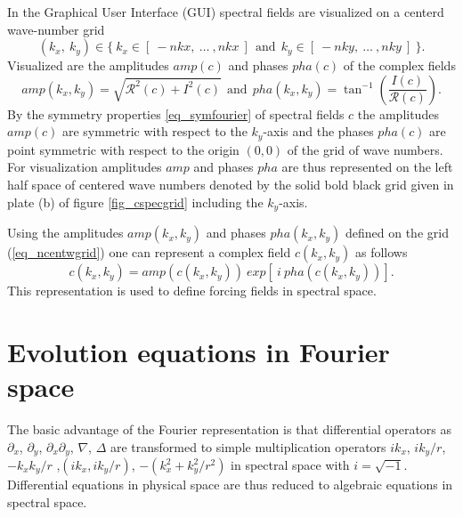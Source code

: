 In the Graphical User Interface (GUI) spectral fields are visualized on
a centerd wave-number grid
\begin{equation} \label{eq_centwgrid}
   (k_{x},\ k_{y}) \in  
   \{\ k_{x} \in [\ -nkx, \ \dots \ ,nkx \ ] 
    \ \ \mbox{and} \ \ 
       k_{y} \in [\ -nky, \ \dots \ ,nky \ ] \ \}.
\end{equation}
Visualized are the amplitudes $amp(c)$ and phases $pha(c)$ of the
complex fields
\begin{equation} \label{eq_c2amppha}
   amp(k_{x},k_{y}) = \sqrt{\mathcal{R}^{2}(c) + I^{2}(c)}
   \ \ \mbox{and} \ \ 
   pha(k_{x},k_{y}) = \tan^{-1}(\frac{I(c)}{\mathcal{R}(c)}).
\end{equation}
By the symmetry properties \ref{eq_symfourier} of spectral fields $c$
the amplitudes $amp(c)$ are symmetric with respect to the $k_{y}$-axis
and the phases $pha(c)$ are point symmetric with respect to the origin
$(0,0)$ of the grid of wave numbers. For visualization amplitudes $amp$
and phases $pha$ are thus represented on the left half space of centered
wave numbers denoted by the solid bold black grid given in plate (b)
of figure \ref{fig_cspecgrid} including the $k_{y}$-axis.


Using the amplitudes $amp(k_{x},k_{y})$ and phases $pha(k_{x},k_{y})$ 
defined on the grid (\ref{eq_ncentwgrid}) one can represent a complex 
field $c(k_{x},k_{y})$ as follows
\begin{equation} \label{eq_amppha2c}
   c(k_{x},k_{y}) = amp(c(k_{x},k_{y})) \ 
       exp \left[ \ i \ pha(c(k_{x},k_{y})) \right].
\end{equation} 
This representation is used to define forcing fields in 
spectral space.  
%
\section{Evolution equations in Fourier space}
%
\label{ssec_evolfourier}
The basic advantage of the Fourier representation is that
differential operators as $\partial_{x}$,
$\partial_{y}$, $\partial_{x} \partial_{y}$, $\nabla$, $\Delta$
are transformed to simple multiplication operators
$i k_{x}$, $i k_{y}/r$, $- k_{x} k_{y}/r$ ,$(i k_{x},i k_{y}/r)$, 
$-(k_{x}^{2} + k_{y}^{2}/r^{2})$ in spectral space with $i = \sqrt{-1}$.
Differential equations in physical space are thus reduced to algebraic 
equations in spectral space.

